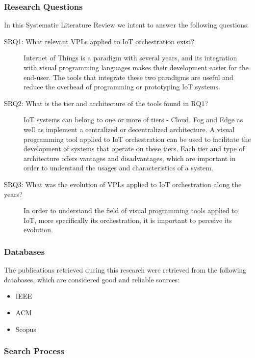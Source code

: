 \subsubsection{Research Questions}\label{sec:research_questions}

In this Systematic Literature Review we intent to answer the following questions:

\begin{description}
    \item [SRQ1: What relevant VPLs applied to IoT orchestration exist?] Internet of Things is a paradigm with several years, and its integration with visual programming languages makes their development easier for the end-user. The tools that integrate these two paradigms are useful and reduce the overhead of programming or prototyping IoT systems.
    \item [SRQ2: What is the tier and architecture of the tools found in RQ1?] IoT systems can belong to one or more of tiers - Cloud, Fog and Edge as well as implement a centralized or decentralized architecture. A visual programming tool applied to IoT orchestration can be used to facilitate the development of systems that operate on these tiers. Each tier and type of architecture offers vantages and disadvantages, which are important in order to understand the usages and characteristics of a system.
    \item [SRQ3: What was the evolution of VPLs applied to IoT orchestration along the years?] In order to understand the field of visual programming tools applied to IoT, more specifically its orchestration, it is important to perceive its evolution.
\end{description}

\subsubsection{Databases}\label{sec:databases}

The publications retrieved during this research were retrieved from the following databases, which are considered good and reliable sources:

\begin{itemize}
    \item IEEE
    \item ACM
    \item Scopus
\end{itemize}{}

\subsubsection{Search Process}\label{sec:process}

